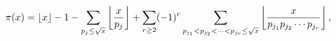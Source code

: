 \[\mathop{\pi\/}\nolimits\!\left(x\right)=\left\lfloor x\right\rfloor-1-\sum_{p_%
{j}\leq\sqrt{x}}\left\lfloor\frac{x}{p_{j}}\right\rfloor+\sum_{r\geq 2}(-1)^{r%
}\*\sum_{p_{j_{1}}<p_{j_{2}}<\cdots<p_{j_{r}}\leq\sqrt{x}}\left\lfloor\frac{x}%
{p_{j_{1}}p_{j_{2}}\cdots p_{j_{r}}}\right\rfloor,\]